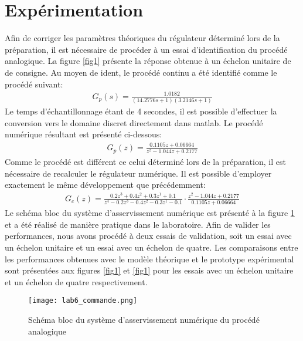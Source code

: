 \section{Expérimentation}
Afin de corriger les paramètres théoriques du régulateur déterminé lors de la préparation, il est nécessaire de procéder à un essai d'identification du procédé analogique. La figure \ref{fig1} présente la réponse obtenue à un échelon unitaire de de consigne. Au moyen de ident, le procédé continu a été identifié comme le procédé suivant:
\begin{gather}
G_p(s) = \frac{1.0182}{(14.2776s +1)(3.2146s + 1)}
\end{gather}
Le temps d'échantillonnage étant de 4 secondes, il est possible d'effectuer la conversion vers le domaine discret directement dans matlab. Le procédé numérique résultant est présenté ci-dessous:
\begin{gather}
G_p(z) = \frac{0.1105z + 0.06664}{z^2 -1.044z + 0.2177}
\end{gather}
Comme le procédé est différent ce celui déterminé lors de la préparation, il est nécessaire de recalculer le régulateur numérique. Il est possible d'employer exactement le même développement que précédemment:
\begin{gather}
G_c(z) = \frac{0.2z^{3} + 0.4z^{2} + 0.3z^{1} + 0.1}{z^4 - 0.2z^{3} - 0.4z^{2} - 0.3z^{1} - 0.1}\cdot \frac{z^2 -1.044z + 0.2177}{0.1105z + 0.06664}
\end{gather}
Le schéma bloc du système d'asservissement numérique est présenté à la figure \ref{fig4} et a été réalisé de manière pratique dans le laboratoire. Afin de valider les performances, nous avons procédé à deux essais de validation, soit un essai avec un échelon unitaire et un essai avec un échelon de quatre. Les comparaisons entre les performances obtenues avec le modèle théorique et le prototype expérimental sont présentées aux figures \ref{fig1} et \ref{fig1} pour les essais avec un échelon unitaire et un échelon de quatre respectivement. 

\begin{figure}[htbp]
\centering
\texttt{[image: lab6\_commande.png]}
\caption{Schéma bloc du système d'asservissement numérique du procédé analogique}
\label{fig4}
\end{figure}